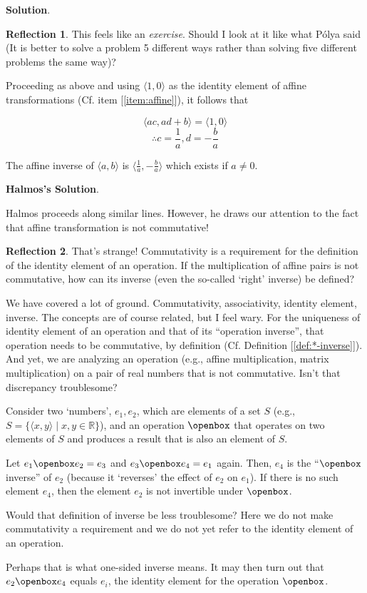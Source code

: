 \documentclass[english,notitlepage,smartquotes]{hgbreport}
\theoremstyle{definition}
\theoremstyle{definition}
\theoremstyle{remark}
\theoremstyle{definition}
\theoremstyle{plain}
\theoremstyle{definition}
\newtheorem{reflection}{Reflection}
\begin{document}
\textbf{Solution}.
\begin{reflection}
This feels like an \emph{exercise}. Should I look at it like what P\'{o}lya said (It is better to solve a problem 5 different ways rather than solving five different problems the same way)?
\end{reflection}
Proceeding as above and using $\langle 1,0\rangle$ as the identity element of affine transformations (Cf. item [\ref{item:affine}]), it follows that

$$
\langle ac,ad+b\rangle=\langle 1,0\rangle
$$
$$
\therefore c=\frac{1}{a}, d=-\frac{b}{a}
$$

The affine inverse of $\langle a,b\rangle$ is $\langle\frac{1}{a},-\frac{b}{a}\rangle$ which exists if $a\ne 0$.

\textbf{Halmos's Solution}.

Halmos proceeds along similar lines. However, he draws our attention to the fact that affine transformation is not commutative! 

\begin{reflection}
That's strange! Commutativity is a requirement for the definition of the identity element of an operation. If the multiplication of affine pairs is not commutative, how can its inverse (even the so-called `right' inverse) be defined?

We have covered a lot of ground. Commutativity, associativity, identity element, inverse. The concepts are of course related, but I feel wary. For the uniqueness of identity element of an operation and that of its ``operation inverse'', that operation needs to be commutative, by definition (Cf. Definition [\ref{def:*-inverse}]). And yet, we are analyzing an operation (e.g., affine multiplication, matrix multiplication) on a pair of real numbers that is not commutative. Isn't that discrepancy troublesome?  

Consider two `numbers', $e_1,e_2$, which are elements of a set $S$ (e.g., $S=\{\langle x,y\rangle\mid x,y\in\mathbb{R}\}$), and an operation $\openbox$ that operates on two elements of $S$ and produces a result that is also an element of $S$. 

Let $e_1\openbox e_2=e_3$ and $e_3\openbox e_4=e_1$ again. Then, $e_4$ is the ``$\openbox$ inverse'' of $e_2$ (because it `reverses' the effect of $e_2$ on $e_1$). If there is no such element $e_4$, then the element $e_2$ is not invertible under $\openbox$.

Would that definition of inverse be less troublesome? Here we do not make commutativity a requirement and we do not yet refer to the identity element of an operation.

Perhaps that is what one-sided inverse means. It may then turn out that $e_2\openbox e_4$ equals $e_i$, the identity element for the operation $\openbox$.
\end{reflection}
\end{document}
